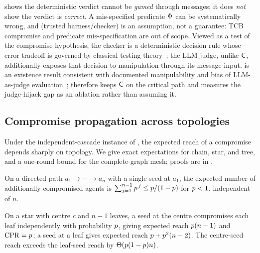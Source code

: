 \begin{remark}
\label{rem:integrity}
 shows the deterministic verdict cannot be \emph{gamed} through
messages; it does \emph{not} show the verdict is \emph{correct}. A mis-specified predicate
$\Phi$ can be systematically wrong, and  (trusted harness/checker) is an
assumption, not a guarantee: TCB compromise and predicate mis-specification are out of
scope. Viewed as a test of the compromise hypothesis, the checker is a deterministic decision rule
whose error tradeoff is governed by classical testing theory~\cite{neyman1933problem,lehmann2005testing};
the LLM judge, unlike $\mathsf{C}$, additionally exposes that decision to manipulation through its
message input.  is an existence result consistent with documented
manipulability and bias of LLM-as-judge evaluation~\cite{zheng2023judging,wang2023fair};
 therefore keeps $\mathsf{C}$ on the critical path and measures the judge-hijack
gap as an ablation rather than assuming it.
\end{remark}

\subsection{Compromise propagation across topologies}
\label{sec:theory-prop}
Under the independent-cascade instance of , the expected reach of a
compromise depends sharply on topology. We give exact expectations for chain, star, and
tree, and a one-round bound for the complete-graph mesh; proofs are in
.

\begin{proposition}
\label{prop:chain}
On a directed path $a_1\to\cdots\to a_n$ with a single seed at $a_1$, the expected number
of additionally compromised agents is $\sum_{j=1}^{n-1}p^{\,j}\le p/(1-p)$ for
$p<1$, independent of $n$.
\end{proposition}

\begin{proposition}
\label{prop:star}
On a star with centre $c$ and $n-1$ leaves, a seed at the centre compromises each leaf
independently with probability $p$, giving expected reach $p(n-1)$ and
$\mathrm{CPR}=p$; a seed at a leaf gives expected reach $p+p^{2}(n-2)$. The centre-seed
reach exceeds the leaf-seed reach by $\Theta(p(1-p)n)$.
\end{proposition}

